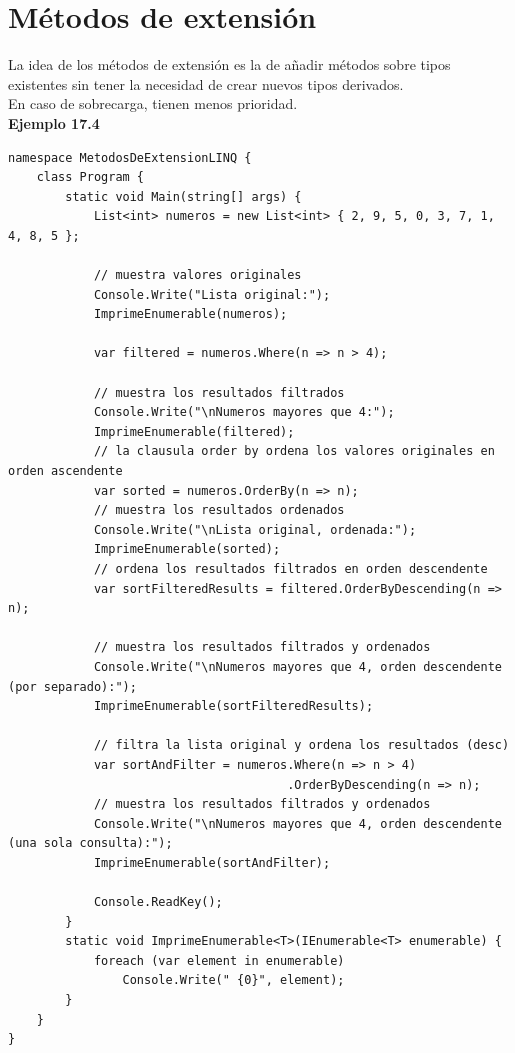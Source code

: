 \documentclass[12pt,a4paper]{report}
\begin{document}
\section{Métodos de extensión}
La idea de los métodos de extensión es la de añadir métodos sobre tipos existentes sin tener la necesidad de crear nuevos tipos derivados.\\En caso de sobrecarga, tienen menos prioridad.\\\textbf{Ejemplo 17.4}
\begin{lstlisting}
namespace MetodosDeExtensionLINQ {
    class Program {
        static void Main(string[] args) {
            List<int> numeros = new List<int> { 2, 9, 5, 0, 3, 7, 1, 4, 8, 5 };

            // muestra valores originales
            Console.Write("Lista original:");
            ImprimeEnumerable(numeros);

            var filtered = numeros.Where(n => n > 4);

            // muestra los resultados filtrados
            Console.Write("\nNumeros mayores que 4:");
            ImprimeEnumerable(filtered);
            // la clausula order by ordena los valores originales en orden ascendente            
            var sorted = numeros.OrderBy(n => n);
            // muestra los resultados ordenados
            Console.Write("\nLista original, ordenada:");
            ImprimeEnumerable(sorted);
            // ordena los resultados filtrados en orden descendente            
            var sortFilteredResults = filtered.OrderByDescending(n => n);

            // muestra los resultados filtrados y ordenados
            Console.Write("\nNumeros mayores que 4, orden descendente (por separado):");
            ImprimeEnumerable(sortFilteredResults);

            // filtra la lista original y ordena los resultados (desc)            
            var sortAndFilter = numeros.Where(n => n > 4)
                                       .OrderByDescending(n => n);
            // muestra los resultados filtrados y ordenados
            Console.Write("\nNumeros mayores que 4, orden descendente (una sola consulta):");
            ImprimeEnumerable(sortAndFilter);

            Console.ReadKey();
        }
        static void ImprimeEnumerable<T>(IEnumerable<T> enumerable) {
            foreach (var element in enumerable)
                Console.Write(" {0}", element);
        }
    }
}
\end{lstlisting}
\end{document}
